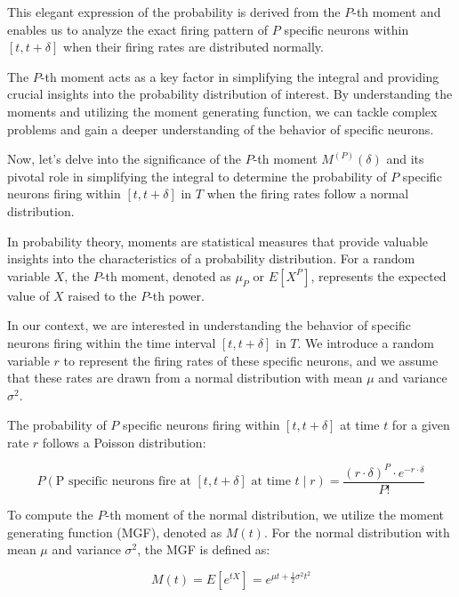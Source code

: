 This elegant expression of the probability is derived from the \(P\)-th moment and enables us to analyze the exact firing pattern of \(P\) specific neurons within \([t, t + \delta]\) when their firing rates are distributed normally.

The \(P\)-th moment acts as a key factor in simplifying the integral and providing crucial insights into the probability distribution of interest. By understanding the moments and utilizing the moment generating function, we can tackle complex problems and gain a deeper understanding of the behavior of specific neurons.


Now, let's delve into the significance of the \(P\)-th moment \(M^{(P)}(\delta)\) and its pivotal role in simplifying the integral to determine the probability of \(P\) specific neurons firing within \([t, t + \delta]\) in \(T\) when the firing rates follow a normal distribution.

In probability theory, moments are statistical measures that provide valuable insights into the characteristics of a probability distribution. For a random variable \(X\), the \(P\)-th moment, denoted as \(\mu_P\) or \(E[X^P]\), represents the expected value of \(X\) raised to the \(P\)-th power.

In our context, we are interested in understanding the behavior of specific neurons firing within the time interval \([t, t + \delta]\) in \(T\). We introduce a random variable \(r\) to represent the firing rates of these specific neurons, and we assume that these rates are drawn from a normal distribution with mean \(\mu\) and variance \(\sigma^2\).

The probability of \(P\) specific neurons firing within \([t, t + \delta]\) at time \(t\) for a given rate \(r\) follows a Poisson distribution:

\begin{equation}
P(\text{P specific neurons fire at } [t, t + \delta] \text{ at time } t \mid r) = \frac{{(r \cdot \delta)^P \cdot e^{-r \cdot \delta}}}{{P!}}
\end{equation}

To compute the \(P\)-th moment of the normal distribution, we utilize the moment generating function (MGF), denoted as \(M(t)\). For the normal distribution with mean \(\mu\) and variance \(\sigma^2\), the MGF is defined as:

\begin{equation}
M(t) = E[e^{tX}] = e^{\mu t + \frac{1}{2}\sigma^2 t^2}
\end{equation}

